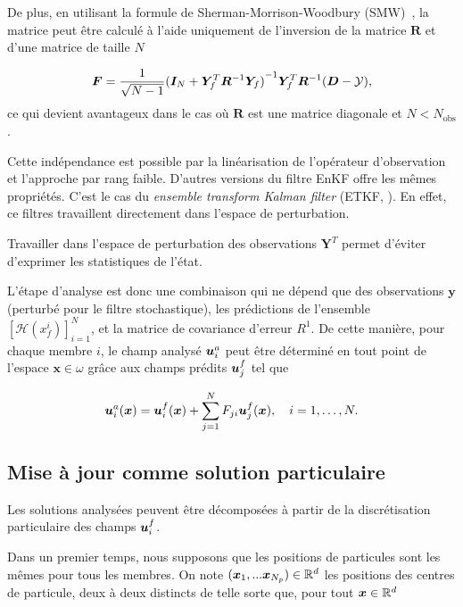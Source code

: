 De plus, en utilisant la formule de Sherman-Morrison-Woodbury (SMW)~\cite{SMW}, la matrice peut être calculé à l'aide uniquement de l'inversion de la matrice $\bm R$ et d'une matrice de taille $N$

\begin{equation*}
    \bm{F} = \frac{1}{\sqrt{N - 1}} {(\bm I_N + \bm Y_f^T\bm R^{-1}\bm Y_f)}^{-1}\bm Y_f^T \bm R^{-1} (\bm{D} - \mathcal{Y}),
\end{equation*}ce qui devient avantageux dans le cas où $\bm R$ est une matrice diagonale et $N < N_{\text{obs}}$.

Cette indépendance est possible par la linéarisation de l'opérateur d'observation et l'approche par rang faible. D'autres versions du filtre EnKF offre les mêmes propriétés. C'est le cas du \textit{ensemble transform Kalman filter} (ETKF, \cite{Hunt2007}). En effet, ce filtres travaillent directement dans l'espace de perturbation.

Travailler dans l'espace de perturbation des observations $\bm Y^T$ permet d'éviter d'exprimer les statistiques de l'état.

L'étape d'analyse est donc une combinaison qui ne dépend que des observations $\bm y$ (perturbé pour le filtre stochastique), les prédictions de l'ensemble $\left[\mathcal{H}(x^i_f)\right]_{i=1}^{N}$, et la matrice de covariance d'erreur $R^{1}$. De cette manière, pour chaque membre $i$, le champ analysé $\bm{u}_i^a$ peut être déterminé en tout point de l'espace $\bm x \in \omega$ grâce aux champs prédits $\bm{u}_j^f$ tel que

\begin{equation}
    \bm{u}_i^a(\bm{x}) =\bm{u}_i^f(\bm{x}) + \sum_{j=1}^{N} F_{ji} \bm{u}_j ^f(\bm{x}), \quad i = 1, \dots, N.
\end{equation}

\subsection{Mise à jour comme solution particulaire}

Les solutions analysées peuvent être décomposées à partir de la discrétisation particulaire des champs $\bm{u}_i^f$.

Dans un premier temps, nous supposons que les positions de particules sont les mêmes pour tous les membres. On note $(\bm{x}_1,...\bm{x}_{N_p}) \in \mathbb{R}^d$ les positions des centres de particule, deux à deux distincts de telle sorte que, pour tout $\bm{x} \in \mathbb{R}^d$

